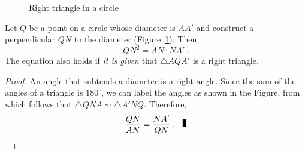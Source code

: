\begin{figure}[b]
\begin{minipage}{.50\textwidth}
\begin{center}
\caption{Right triangle in a circle}\label{f.circle-besant}
\end{center}
\end{minipage}
\end{figure}


\begin{theorem}\label{thm.alt-hypo}
Let $Q$ be a point on a circle whose diameter is $AA'$ and construct a perpendicular $QN$ to the diameter (Figure~\ref{f.circle-besant}). Then
\[
QN^2=AN\cdot NA'\,.
\]
The equation also holds if \emph{it is given} that $\triangle AQA'$ is a right triangle.
\end{theorem}

\begin{proof}
An angle that subtends a diameter is a right angle. Since the sum of the angles of a triangle is $180^\circ$, we can label the angles as shown in the Figure, from which follows that $\triangle QNA \sim\triangle A'NQ$. Therefore,
\[
\frac{QN}{AN} = \frac{NA'}{QN}\,.\fqed
\]
\end{proof}


